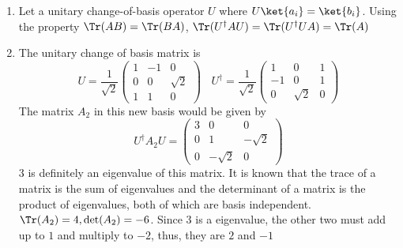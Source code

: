 \begin{sol}
\begin{enumerate}[label=\textbf{(\alph*)}]
    \item
    Let a unitary change-of-basis operator $U$ where $U\ket {a_i}=\ket{b_i}$. Using the property $\Tr(AB)=\Tr(BA)$, $\Tr(U^\dagger AU)=\Tr(U^\dagger UA)=\Tr(A)$
    \item
    The unitary change of basis matrix is
    $$U=\frac{1}{\sqrt{2}}\begin{pmatrix}1&-1&0\\0&0&\sqrt{2}\\1&1&0\end{pmatrix}\:\:\:\:U^\dagger=\frac{1}{\sqrt{2}}\begin{pmatrix}1&0&1\\-1&0&1\\0&\sqrt{2}&0\end{pmatrix}$$
    The matrix $A_2$ in this new basis would be given by 
    $$U^\dagger A_2U=\begin{pmatrix}3&0&0\\0&1&-\sqrt{2}\\0&-\sqrt{2}&0\end{pmatrix}$$
    $3$ is definitely an eigenvalue of this matrix. It is known that the trace of a matrix is the sum of eigenvalues and the determinant of a matrix is the product of eigenvalues, both of which are basis independent. $\Tr(A_2)=4, \det(A_2)=-6$. Since $3$ is a eigenvalue, the other two must add up to $1$ and multiply to $-2$, thus, they are $2$ and $-1$
\end{enumerate}
\end{sol}